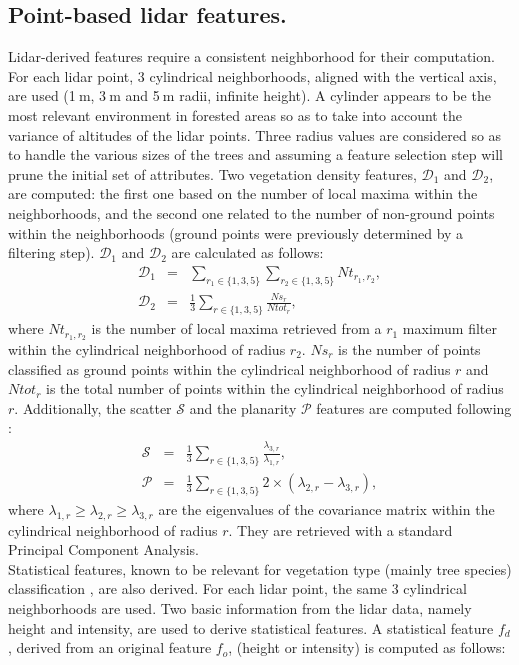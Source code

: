 \subsection{Point-based lidar features.}
Lidar-derived features require a consistent neighborhood for their computation. For each lidar point, 3 cylindrical neighborhoods, aligned with the vertical axis, are used (1$\:$m, 3$\:$m and 5$\:$m radii, infinite height). A cylinder appears to be the most relevant environment in forested areas so as to take into account the variance of altitudes of the lidar points. Three radius values are considered so as to handle the various sizes of the trees and assuming a feature selection step will prune the initial set of attributes. {Two vegetation density features, $\mathcal{D}_{1}$ and $\mathcal{D}_{2}$, are computed: the first one based on the number of local maxima within the neighborhoods, and the second one related to the number of non-ground points within the neighborhoods (ground points were previously determined by a filtering step). $\mathcal{D}_{1}$ and $\mathcal{D}_{2}$ are calculated as follows:
\begin{eqnarray}
\mathcal{D}_{1} & = & \sum_{r_{1} \in \{1,3,5\}}\sum_{r_{2} \in \{1,3,5\}}Nt_{r_{1},r_{2}}, \\
\mathcal{D}_{2} & = & \frac{1}{3}\sum_{r \in \{1,3,5\}}\frac{Ns_{r}}{Ntot_{r}},
\end{eqnarray}
where $Nt_{r_{1},r_{2}}$ is the number of local maxima retrieved from a $r_{1}$ maximum filter within the cylindrical neighborhood of radius $r_{2}$. $Ns_{r}$ is the number of points classified as ground points within the cylindrical neighborhood of radius $r$ and $Ntot_{r}$ is the total number of points within the cylindrical neighborhood of radius $r$.} Additionally, the scatter $\mathcal{S}$ and the planarity $\mathcal{P}$ features are computed following \citet{Weinmann2015286}:
\begin{eqnarray}
\mathcal{S} & = & \frac{1}{3}\sum_{r \in \{1,3,5\}}\frac{\lambda_{3,r}}{\lambda_{1,r}}, \\
\mathcal{P} & = & \frac{1}{3}\sum_{r \in \{1,3,5\}}2\times(\lambda_{2,r}-\lambda_{3,r}),
\end{eqnarray}
where $\lambda_{1,r}\geq\lambda_{2,r}\geq\lambda_{3,r}$ are the eigenvalues of the covariance matrix within the cylindrical neighborhood of radius $r$. They are retrieved with a standard Principal Component Analysis. \\
Statistical features, known to be relevant for vegetation type (mainly tree species) classification \citep{dalponte2014tree,torabzadeh2015optimal}, are also derived. For each lidar point, the same 3 cylindrical neighborhoods are used. Two basic information from the lidar data, namely height and intensity, are used to derive statistical features. A statistical feature $f_{d}$, derived from an original feature $f_{o}$, (height or intensity) is computed as follows: \\
